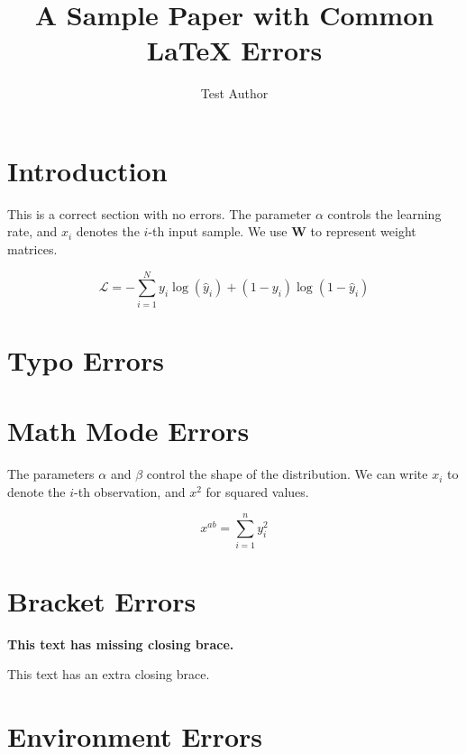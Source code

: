 \documentclass{article}
\title{A Sample Paper with Common LaTeX Errors}
\author{Test Author}
\begin{document}
\maketitle

\section{Introduction}

This is a correct section with no errors. The parameter $\alpha$ controls the learning rate,
and $x_i$ denotes the $i$-th input sample. We use $\mathbf{W}$ to represent weight matrices.

\begin{equation}
  \mathcal{L} = -\sum_{i=1}^{N} y_i \log(\hat{y}_i) + (1 - y_i) \log(1 - \hat{y}_i)
\end{equation}

\section{Typo Errors}


\section{Math Mode Errors}

The parameters $\alpha$ and $\beta$ control the shape of the distribution.
We can write $x_i$ to denote the $i$-th observation, and $x^2$ for squared values.

\begin{equation}
  x^{ab} = \sum_{i=1}^{n} y_i^2
\end{equation}

\section{Bracket Errors}

\textbf{This text has missing closing brace.}

This text has an extra closing brace.

\section{Environment Errors}
\end{document}

